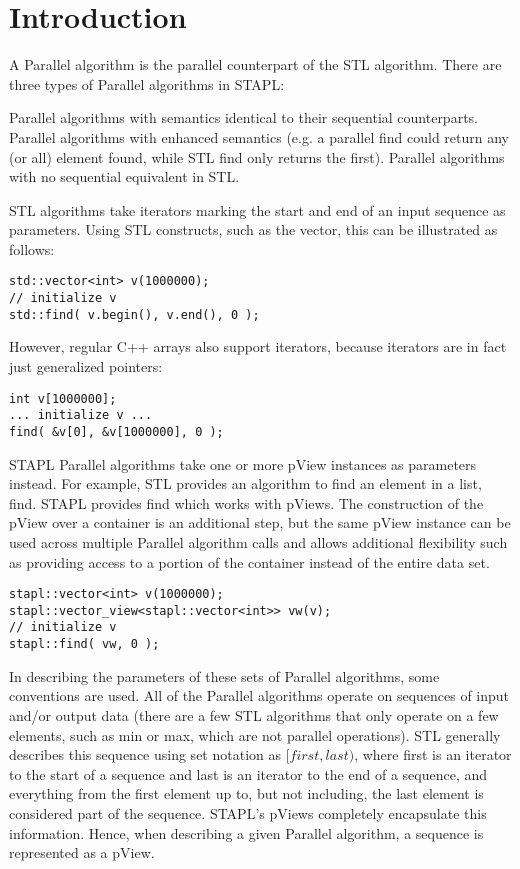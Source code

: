 
\section{Introduction}

A Parallel algorithm is the parallel counterpart of the STL algorithm. There are three types of Parallel algorithms in STAPL:

Parallel algorithms with semantics identical to their sequential counterparts.
Parallel algorithms with enhanced semantics (e.g. a parallel find could return any (or all) element found, while STL find only returns the first).
Parallel algorithms with no sequential equivalent in STL.

STL algorithms take iterators marking the start and end of an input sequence as parameters. Using STL constructs, such as the vector, this can be illustrated as follows:

\begin{verbatim}
std::vector<int> v(1000000);
// initialize v
std::find( v.begin(), v.end(), 0 );
\end{verbatim}

However, regular C++ arrays also support iterators, because iterators are in fact just generalized pointers:

\begin{verbatim}
int v[1000000];
... initialize v ...
find( &v[0], &v[1000000], 0 );
\end{verbatim}

STAPL Parallel algorithms take one or more pView instances as parameters instead. For example, STL provides an algorithm to find an element in a list, find. STAPL provides find which works with pViews. The construction of the pView over a container is an additional step, but the same pView instance can be used across multiple Parallel algorithm calls and allows additional flexibility such as providing access to a portion of the container instead of the entire data set.

\begin{verbatim}
stapl::vector<int> v(1000000);
stapl::vector_view<stapl::vector<int>> vw(v);
// initialize v
stapl::find( vw, 0 );
\end{verbatim}

In describing the parameters of these sets of Parallel algorithms, some conventions are used. All of the Parallel algorithms operate on sequences of input and/or output data (there are a few STL algorithms that only operate on a few elements, such as min or max, which are not parallel operations). STL generally describes this sequence using set notation as $[first, last)$, where first is an iterator to the start of a sequence and last is an iterator to the end of a sequence, and everything from the first element up to, but not including, the last element is considered part of the sequence. STAPL's pViews completely encapsulate this information. Hence, when describing a given Parallel algorithm, a sequence is represented as a pView.

